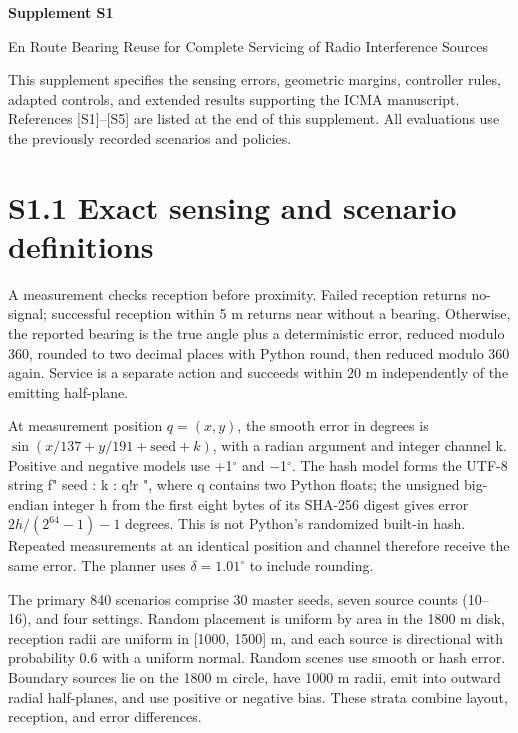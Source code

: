 \documentclass[11pt,letterpaper]{article}
\begin{document}
\begin{center}{\Large\bfseries Supplement S1}\end{center}

\begin{center}{\large En Route Bearing Reuse for Complete Servicing of Radio Interference Sources}\end{center}

This supplement specifies the sensing errors, geometric margins, controller rules, adapted controls, and extended results supporting the ICMA manuscript. References [S1]--[S5] are listed at the end of this supplement. All evaluations use the previously recorded scenarios and policies.

\section*{S1.1 Exact sensing and scenario definitions}

A measurement checks reception before proximity. Failed reception returns no-signal; successful reception within 5 m returns near without a bearing. Otherwise, the reported bearing is the true angle plus a deterministic error, reduced modulo 360, rounded to two decimal places with Python round, then reduced modulo 360 again. Service is a separate action and succeeds within 20 m independently of the emitting half-plane.

At measurement position $q=(x,y)$, the smooth error in degrees is $\sin(x/137+y/191+\mathrm{seed}+k)$, with a radian argument and integer channel k. Positive and negative models use +1\ensuremath{^\circ} and \ensuremath{-}1\ensuremath{^\circ}. The hash model forms the UTF-8 string {\selectfont f" seed : k : q!r "}, where q contains two Python floats; the unsigned big-endian integer h from the first eight bytes of its SHA-256 digest gives error $2h/(2^{64}-1)-1$ degrees. This is not Python's randomized built-in hash. Repeated measurements at an identical position and channel therefore receive the same error. The planner uses $\delta=1.01^\circ$ to include rounding.

The primary 840 scenarios comprise 30 master seeds, seven source counts (10--16), and four settings. Random placement is uniform by area in the 1800 m disk, reception radii are uniform in [1000, 1500] m, and each source is directional with probability 0.6 with a uniform normal. Random scenes use smooth or hash error. Boundary sources lie on the 1800 m circle, have 1000 m radii, emit into outward radial half-planes, and use positive or negative bias. These strata combine layout, reception, and error differences.
\end{document}
